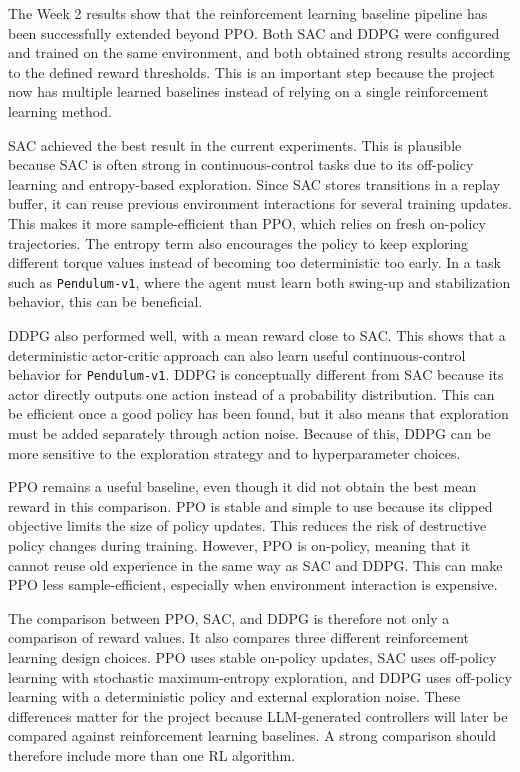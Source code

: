 \documentclass[11pt,a4paper]{article}
\begin{document}
The Week 2 results show that the reinforcement learning baseline pipeline has been successfully extended beyond PPO. Both SAC and DDPG were configured and trained on the same environment, and both obtained strong results according to the defined reward thresholds. This is an important step because the project now has multiple learned baselines instead of relying on a single reinforcement learning method.

SAC achieved the best result in the current experiments. This is plausible because SAC is often strong in continuous-control tasks due to its off-policy learning and entropy-based exploration. Since SAC stores transitions in a replay buffer, it can reuse previous environment interactions for several training updates. This makes it more sample-efficient than PPO, which relies on fresh on-policy trajectories. The entropy term also encourages the policy to keep exploring different torque values instead of becoming too deterministic too early. In a task such as \texttt{Pendulum-v1}, where the agent must learn both swing-up and stabilization behavior, this can be beneficial.

DDPG also performed well, with a mean reward close to SAC. This shows that a deterministic actor-critic approach can also learn useful continuous-control behavior for \texttt{Pendulum-v1}. DDPG is conceptually different from SAC because its actor directly outputs one action instead of a probability distribution. This can be efficient once a good policy has been found, but it also means that exploration must be added separately through action noise. Because of this, DDPG can be more sensitive to the exploration strategy and to hyperparameter choices.

PPO remains a useful baseline, even though it did not obtain the best mean reward in this comparison. PPO is stable and simple to use because its clipped objective limits the size of policy updates. This reduces the risk of destructive policy changes during training. However, PPO is on-policy, meaning that it cannot reuse old experience in the same way as SAC and DDPG. This can make PPO less sample-efficient, especially when environment interaction is expensive.

The comparison between PPO, SAC, and DDPG is therefore not only a comparison of reward values. It also compares three different reinforcement learning design choices. PPO uses stable on-policy updates, SAC uses off-policy learning with stochastic maximum-entropy exploration, and DDPG uses off-policy learning with a deterministic policy and external exploration noise. These differences matter for the project because LLM-generated controllers will later be compared against reinforcement learning baselines. A strong comparison should therefore include more than one RL algorithm.
\end{document}
